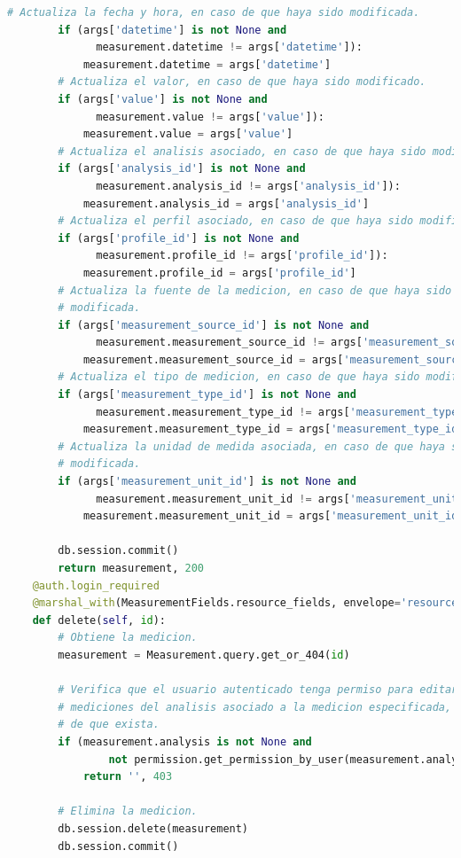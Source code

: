 \documentclass[a4paper,12pt]{article}
\begin{document}
\begin{enumerate}
\begin{lstlisting}[language=Python]
        # Actualiza la fecha y hora, en caso de que haya sido modificada.
        if (args['datetime'] is not None and
              measurement.datetime != args['datetime']):
            measurement.datetime = args['datetime']
        # Actualiza el valor, en caso de que haya sido modificado.
        if (args['value'] is not None and
              measurement.value != args['value']):
            measurement.value = args['value']
        # Actualiza el analisis asociado, en caso de que haya sido modificado.
        if (args['analysis_id'] is not None and
              measurement.analysis_id != args['analysis_id']):
            measurement.analysis_id = args['analysis_id']
        # Actualiza el perfil asociado, en caso de que haya sido modificado.
        if (args['profile_id'] is not None and
              measurement.profile_id != args['profile_id']):
            measurement.profile_id = args['profile_id']
        # Actualiza la fuente de la medicion, en caso de que haya sido
        # modificada.
        if (args['measurement_source_id'] is not None and
              measurement.measurement_source_id != args['measurement_source_id']):
            measurement.measurement_source_id = args['measurement_source_id']
        # Actualiza el tipo de medicion, en caso de que haya sido modificado.
        if (args['measurement_type_id'] is not None and
              measurement.measurement_type_id != args['measurement_type_id']):
            measurement.measurement_type_id = args['measurement_type_id']
        # Actualiza la unidad de medida asociada, en caso de que haya sido
        # modificada.
        if (args['measurement_unit_id'] is not None and
              measurement.measurement_unit_id != args['measurement_unit_id']):
            measurement.measurement_unit_id = args['measurement_unit_id']

        db.session.commit()
        return measurement, 200
    @auth.login_required
    @marshal_with(MeasurementFields.resource_fields, envelope='resource')
    def delete(self, id):
        # Obtiene la medicion.
        measurement = Measurement.query.get_or_404(id)

        # Verifica que el usuario autenticado tenga permiso para editar las
        # mediciones del analisis asociado a la medicion especificada, en caso
        # de que exista.
        if (measurement.analysis is not None and
                not permission.get_permission_by_user(measurement.analysis, g.user, 'edit_measurements')):
            return '', 403

        # Elimina la medicion.
        db.session.delete(measurement)
        db.session.commit()


\end{lstlisting}
\end{enumerate}
\end{document}
